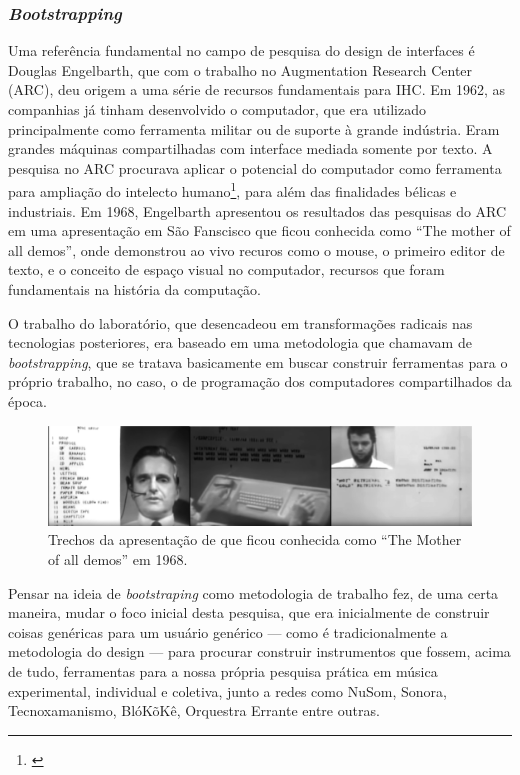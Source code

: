\subsubsection{\emph{Bootstrapping}}

Uma referência fundamental no campo de pesquisa do design de interfaces é Douglas Engelbarth, que com o trabalho no Augmentation Research Center (ARC), deu origem a uma série de recursos fundamentais para IHC. Em 1962, as companhias já tinham desenvolvido o computador, que era utilizado principalmente como ferramenta militar ou de suporte à grande indústria. Eram grandes máquinas compartilhadas com interface mediada somente por texto. A pesquisa no ARC procurava aplicar o potencial do computador como ferramenta para ampliação do intelecto humano\footnote{\cite{Engelbart1962}}, para além das finalidades bélicas e industriais. Em 1968, Engelbarth apresentou os resultados das pesquisas do ARC em uma apresentação em São Fanscisco que ficou conhecida como ``The mother of all demos'', onde demonstrou ao vivo recuros como o mouse, o primeiro editor de texto, e o conceito de espaço visual no computador, recursos que foram fundamentais na história da computação. 


O trabalho do laboratório, que desencadeou em transformações radicais nas tecnologias posteriores, era baseado em uma metodologia que chamavam de \emph{bootstrapping}, que se tratava basicamente em buscar construir ferramentas para o próprio trabalho, no caso, o de programação dos computadores compartilhados da época.  


\begin{figure}
    \caption{\label{motherofalldemos}Trechos da apresentação de que ficou conhecida como ``The Mother of all demos'' em 1968.}
    
        \includegraphics[width=1\linewidth]{pictures/cap2/mother_of_all}
    
\end{figure}



Pensar na ideia de \emph{bootstraping} como metodologia de trabalho fez, de uma certa maneira, mudar o foco inicial desta pesquisa, que era inicialmente de construir coisas genéricas para um usuário genérico --- como é tradicionalmente a metodologia do design --- para procurar construir instrumentos que fossem, acima de tudo, ferramentas para a nossa própria pesquisa prática em música experimental, individual e coletiva, junto a redes como NuSom, Sonora, Tecnoxamanismo, BlóKõKê, Orquestra Errante entre outras.

